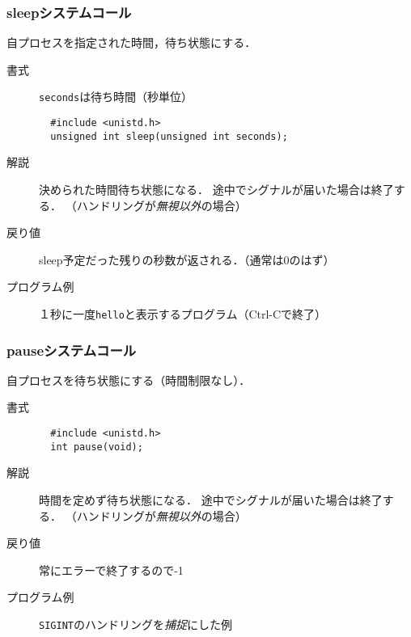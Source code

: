 \documentclass{beamer}                 %
\begin{document}
\begin{frame}[fragile]
  \frametitle{sleepシステムコール}
  自プロセスを指定された時間，待ち状態にする．

  \begin{description}
  \item[書式] \texttt{seconds}は待ち時間（秒単位）

\begin{verbatim}
  #include <unistd.h>
  unsigned int sleep(unsigned int seconds);
\end{verbatim}

  \item[解説]
    決められた時間待ち状態になる．
    途中でシグナルが届いた場合は終了する．
    （ハンドリングが\emph{無視以外}の場合）

  \item[戻り値]
    sleep予定だった残りの秒数が返される．（通常は0のはず）
  
  \item[プログラム例]
    １秒に一度\texttt{hello}と表示するプログラム（Ctrl-Cで終了）
  \end{description}
\end{frame}

\begin{frame}[fragile]
  \frametitle{pauseシステムコール}
  自プロセスを待ち状態にする（時間制限なし）．

  \begin{description}
  \item[書式]
\begin{verbatim}
  #include <unistd.h>
  int pause(void);
\end{verbatim}

  \item[解説]
    時間を定めず待ち状態になる．
    途中でシグナルが届いた場合は終了する．
    （ハンドリングが\emph{無視以外}の場合）

  \item[戻り値]
    常にエラーで終了するので-1
  
  \item[プログラム例] \texttt{SIGINT}のハンドリングを\emph{捕捉}にした例
  \end{description}
\end{frame}
\end{document}
